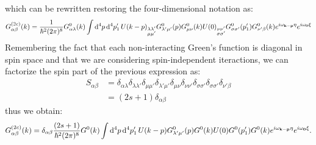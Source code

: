 \documentclass[a4paper]{article}
\begin{document}
which can be rewritten restoring the four-dimensional notation as:
\begin{equation*}
G^{(2c)}_{\alpha\beta}(k) =  \frac{1}{\hbar^2(2\pi)^8} G^0_{\alpha\lambda}(k)\int \dd[4]{p} \dd[4]{p_1'} U(k-p)_{\substack{\lambda\lambda' \\ \mu\mu'}} G^0_{\lambda'\mu'}(p) G^0_{\mu\nu}(k)U(0)_{\substack{\nu\nu' \\ \sigma\sigma'}} G^0_{\sigma\sigma'}(p_1')G^0_{\nu'\beta}(k)e^{i\omega_{\vb{k}-\vb{p}} \eta}e^{i\omega_{\vb{0}}\xi}
 \end{equation*}
Remembering the fact that each non-interacting Green's function is diagonal in spin space and that we are considering spin-independent iteractions, we can factorize the spin part of the previous expression as:
\begin{align*}
S_{\alpha\beta} &= \delta_{\alpha\lambda} \delta_{\lambda\lambda'}\delta_{\mu\mu'}\delta_{\lambda'\mu'}\delta_{\mu\nu}\delta_{\nu\nu'}\delta_{\sigma\sigma'}\delta_{\sigma\sigma'}\delta_{\nu'\beta}\\
& = (2s+1)\delta_{\alpha\beta}
\end{align*}
thus we obtain:
\begin{equation*}
G^{(2c)}_{\alpha\beta}(k) =  \delta_{\alpha\beta}\frac{(2s+1)}{\hbar^2(2\pi)^8} G^0(k)\int \dd[4]{p} \dd[4]{p_1'} U(k-p)G^0_{\lambda'\mu'}(p) G^0(k)U(0)G^0(p_1')G^0(k)e^{i\omega_{\vb{k}-\vb{p}} \eta}e^{i\omega_{\vb{0}}\xi}.
 \end{equation*}
\end{document}
